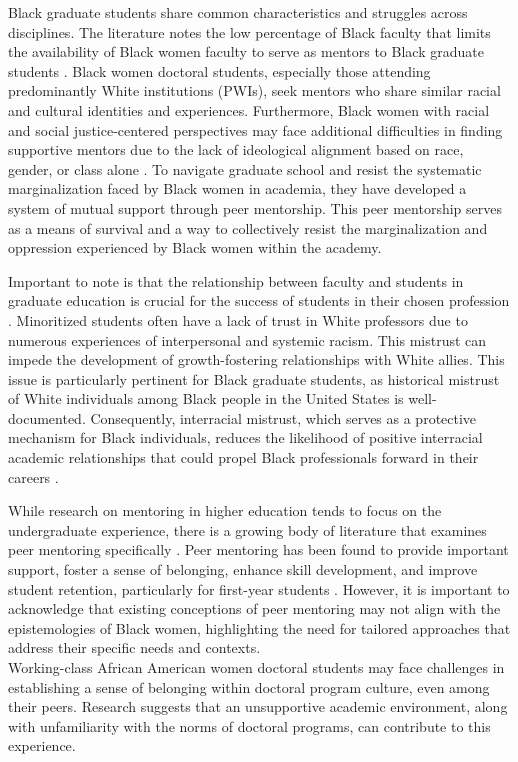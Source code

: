 \documentclass[
  11pt,
]{book}
\begin{document}
Black graduate students share common characteristics and struggles across disciplines. The literature notes the low percentage of Black faculty that limits the availability of Black women faculty to serve as mentors to Black graduate students \citep{minnett_help_2019}. Black women doctoral students, especially those attending predominantly White institutions (PWIs), seek mentors who share similar racial and cultural identities and experiences. Furthermore, Black women with racial and social justice-centered perspectives may face additional difficulties in finding supportive mentors due to the lack of ideological alignment based on race, gender, or class alone \citep{minnett_help_2019}. To navigate graduate school and resist the systematic marginalization faced by Black women in academia, they have developed a system of mutual support through peer mentorship. This peer mentorship serves as a means of survival and a way to collectively resist the marginalization and oppression experienced by Black women within the academy.

Important to note is that the relationship between faculty and students in graduate education is crucial for the success of students in their chosen profession \citep{brown_interracial_2021}. Minoritized students often have a lack of trust in White professors due to numerous experiences of interpersonal and systemic racism. This mistrust can impede the development of growth-fostering relationships with White allies. This issue is particularly pertinent for Black graduate students, as historical mistrust of White individuals among Black people in the United States is well-documented. Consequently, interracial mistrust, which serves as a protective mechanism for Black individuals, reduces the likelihood of positive interracial academic relationships that could propel Black professionals forward in their careers \citep{brown_interracial_2021}.

While research on mentoring in higher education tends to focus on the undergraduate experience, there is a growing body of literature that examines peer mentoring specifically \citep{brown_interracial_2021}. Peer mentoring has been found to provide important support, foster a sense of belonging, enhance skill development, and improve student retention, particularly for first-year students \citep{brown_interracial_2021}. However, it is important to acknowledge that existing conceptions of peer mentoring may not align with the epistemologies of Black women, highlighting the need for tailored approaches that address their specific needs and contexts.\\
Working-class African American women doctoral students may face challenges in establishing a sense of belonging within doctoral program culture, even among their peers. Research suggests that an unsupportive academic environment, along with unfamiliarity with the norms of doctoral programs, can contribute to this experience.
\end{document}
